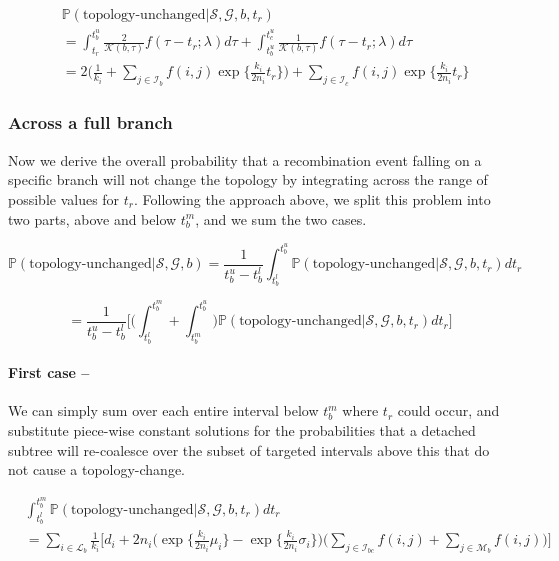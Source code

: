 \documentclass[11pt]{article}
\begin{document}
\begin{equation}
\begin{aligned}
	&\mathbb{P}(\text{topology-unchanged} | \mathcal{S}, \mathcal{G}, b, t_r) \\
	&= \int_{t_r}^{t_b^u} \frac{2}{\mathcal{K}(b,\tau)} f(\tau - t_r; \lambda) d\tau + 
	 \int_{t_b^u}^{t_c^u} \frac{1}{\mathcal{K}(b, \tau)} f(\tau - t_r; \lambda) d\tau \\
	&= 2 \bigg(
		\frac{1}{k_i} + 
		\sum_{j \in \mathcal{I}_b} f(i,j) \exp \bigg\{ \frac{k_i}{2n_i} t_r \bigg\}
	\bigg) + 
	\sum_{j \in \mathcal{I}_c} f(i,j) \exp \bigg\{ \frac{k_i}{2n_i} t_r \bigg\}
\end{aligned}
\end{equation}

\subsubsection{Across a full branch}

Now we derive the overall probability that a recombination event falling on a specific branch will 
not change the topology by integrating across the range of possible values for $t_r$.
Following the approach above, we split this problem into two parts, above and below
$t_b^m$, and we sum the two cases.

\begin{equation}
	\mathbb{P}(\text{topology-unchanged} | \mathcal{S}, \mathcal{G}, b) = 
	\frac{1}{t_b^u - t_b^l} \int_{t_b^l}^{t_b^u}
	\mathbb{P}(\text{topology-unchanged} | \mathcal{S}, \mathcal{G},b, t_r) dt_r
\end{equation}

\begin{equation}
	= \frac{1}{t_b^u - t_b^l}
	\bigg[
		\bigg(
			\int_{t_b^l}^{t_b^m} + 
			\int_{t_b^m}^{t_b^u}
		\bigg)
		\mathbb{P}(\text{topology-unchanged} | \mathcal{S}, \mathcal{G},b, t_r) dt_r
	\bigg]
\end{equation}


\paragraph{First case --}
We can simply sum over each entire interval below $t_b^m$ where $t_r$ could occur, and 
substitute piece-wise constant solutions for the probabilities that a detached
subtree will re-coalesce over the subset of targeted intervals above this that
do not cause a topology-change.

\begin{equation}
\begin{aligned}
	&\int_{t_b^l}^{t_b^m} {\mathbb{P}(\text{topology-unchanged} | \mathcal{S}, \mathcal{G}, b, t_r)} dt_r \\
	&= \sum_{i \in \mathcal{L}_b} \frac{1}{k_i} \Bigg[ 
		d_i + 2n_i \bigg( 
			\exp \bigg\{\frac{k_i}{2n_i} \mu_i \bigg\} - 
			\exp \bigg\{\frac{k_i}{2n_i} \sigma_i\bigg\} 
		\bigg)
		\bigg(
			\sum_{j \in \mathcal{I}_{bc}} f(i,j) + \sum_{j \in \mathcal{M}_b} f(i,j) 
		\bigg) 
	\Bigg]
\end{aligned}
\end{equation}
\end{document}

